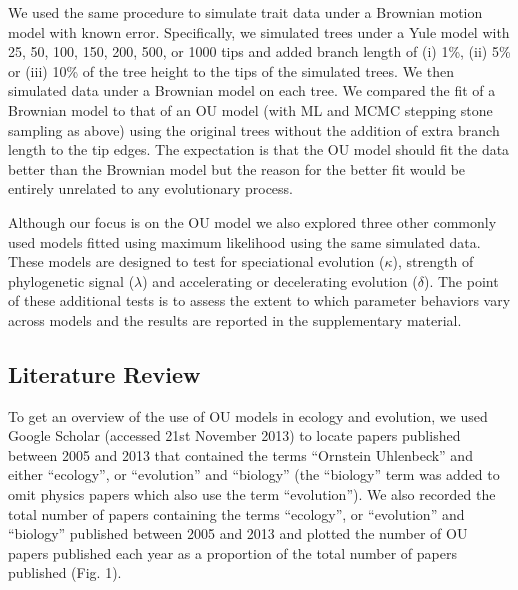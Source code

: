 \documentclass[a4paper,12pt]{article}
\begin{document}
We used the same procedure to simulate trait data under a Brownian motion model with known error. Specifically, we simulated trees under a Yule model with 25, 50, 100, 150, 200, 500, or 1000 tips and added branch length of (i) 1\%, (ii) 5\% or (iii) 10\% of the tree height to the tips of the simulated trees. We then simulated data under a Brownian model on each tree. We compared the fit of a Brownian model to that of an OU model (with ML and MCMC stepping stone sampling as above) using the original trees without the addition of extra branch length to the tip edges. The expectation is that the OU model should fit the data better than the Brownian model but the reason for the better fit would be entirely unrelated to any evolutionary process. 

Although our focus is on the OU model we also explored three other commonly used models \citep[$\kappa$, $\lambda$, and $\delta$;][]{Pagel:1997aa,Pagel:1999aa} fitted using maximum likelihood using the same simulated data. These models are designed to test for speciational evolution ($\kappa$), strength of phylogenetic signal ($\lambda$) and accelerating or decelerating evolution ($\delta$). The point of these additional tests is to assess the extent to which parameter behaviors vary across models and the results are reported in the supplementary material. 

\subsection{Literature Review}
\label{section:literature.methods} 
To get an overview of the use of OU models in ecology and evolution, we used Google Scholar (accessed 21st November 2013) to locate papers published between 2005 \citep[when the R package ouch was released;][]{Butler:2004aa} and 2013 that contained the terms “Ornstein Uhlenbeck” and either “ecology”, or “evolution” and “biology” (the “biology” term was added to omit physics papers which also use the term “evolution”). We also recorded the total number of papers containing the terms “ecology”, or “evolution” and “biology” published between 2005 and 2013 and plotted the number of OU papers published each year as a proportion of the total number of papers published (Fig. 1).
\end{document}

